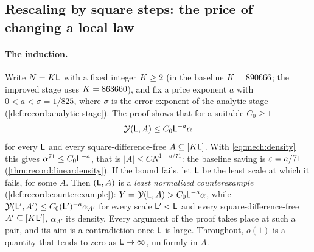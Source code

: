 \subsection{Rescaling by square steps: the price of changing a local law}\label{subsec:mech:prices}

\paragraph{The induction.}
Write $N=K\mathsf L$ with a fixed integer $K\ge2$ (in the
baseline $K=890666$; the improved stage uses
$K=863660$), and fix a price exponent $a$ with
$0<a<\sigma=1/825$,
where $\sigma$ is the error exponent of the analytic stage
(\cref{def:record:analytic-stage}). The proof shows that for a suitable
$C_0\ge1$
\[
 \mathcal Y(\mathsf L,A)\le C_0\mathsf L^{-a}\alpha
\]
for every $\mathsf L$ and every square-difference-free $A\subseteq[K\mathsf L]$. With
\eqref{eq:mech:density} this gives $\alpha^{71}\le C_0\mathsf L^{-a}$, that is
$|A|\le CN^{1-a/71}$: the baseline saving is $\varepsilon=a/71$
(\cref{thm:record:lineardensity}). If the bound fails, let $\mathsf L$ be the least
scale at which it fails, for some $A$. Then $(\mathsf L,A)$ is a \emph{least
normalized counterexample} (\cref{def:record:counterexample}):
$Y=\mathcal Y(\mathsf L,A)>C_0\mathsf L^{-a}\alpha$, while
$\mathcal Y(\mathsf L',A')\le C_0(\mathsf L')^{-a}\alpha_{A'}$ for every scale
$\mathsf L'<\mathsf L$ and every square-difference-free $A'\subseteq[K\mathsf L']$,
$\alpha_{A'}$ its density. Every argument of the proof takes place at such a
pair, and its aim is a contradiction once $\mathsf L$ is large. Throughout,
$o(1)$ is a quantity that tends to zero as $\mathsf L\to\infty$, uniformly in $A$.

